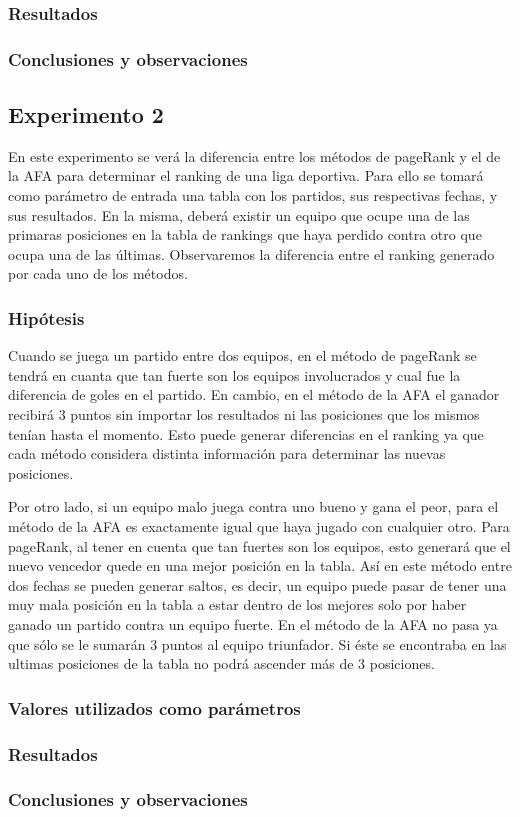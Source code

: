 		\subsubsection*{Resultados}

		\subsubsection*{Conclusiones y observaciones} 

	\subsection{Experimento 2}
	En este experimento se verá la diferencia entre los métodos de pageRank y el de la AFA para determinar el ranking de una liga deportiva. Para ello se tomará como parámetro de entrada una tabla con los partidos, sus respectivas fechas, y sus resultados. En la misma, deberá existir un equipo que ocupe una de las primaras posiciones en la tabla de rankings que haya perdido contra otro que ocupa una de las últimas. Observaremos la diferencia entre el ranking generado por cada uno de los métodos.
		

		\subsubsection*{Hipótesis} 
		Cuando se juega un partido entre dos equipos, en el método de pageRank se tendrá en cuanta que tan fuerte son los equipos involucrados y cual fue la diferencia de goles en el partido. En cambio, en el método de la AFA el ganador recibirá 3 puntos sin importar los resultados ni las posiciones que los mismos tenían hasta el momento. Esto puede generar diferencias en el ranking ya que cada método considera distinta información para determinar las nuevas posiciones. 
		
		Por otro lado, si un equipo malo juega contra uno bueno y gana el peor, para el método de la AFA es exactamente igual que haya jugado con cualquier otro. Para pageRank, al tener en cuenta que tan fuertes son los equipos, esto generará que el nuevo vencedor quede en una mejor posición en la tabla. Así en este método entre dos fechas se pueden generar saltos, es decir, un equipo puede pasar de tener una muy mala posición en la tabla a estar dentro de los mejores solo por haber ganado un partido contra un equipo fuerte. En el método de la AFA no pasa ya que sólo se le sumarán 3 puntos al equipo triunfador. Si éste se encontraba en las ultimas posiciones de la tabla no podrá ascender más de 3 posiciones. 		

		\subsubsection*{Valores utilizados como parámetros} 

		\subsubsection*{Resultados}

		\subsubsection*{Conclusiones y observaciones} 

